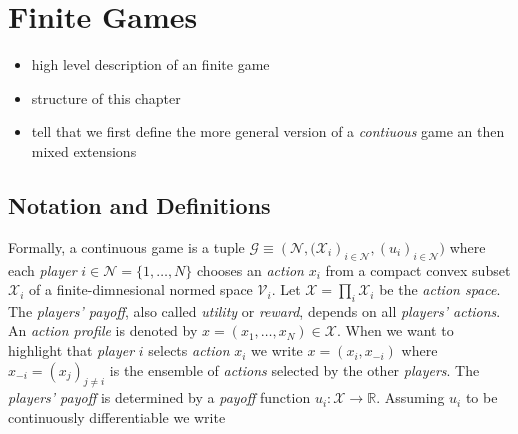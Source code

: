 
\chapter{Finite Games}\label{chapter:finiteGames}

\begin{itemize}
    \item high level description of an finite game
    \item structure of this chapter
    \item tell that we first define the more general version of a \textit{contiuous} game an then mixed extensions
    
\end{itemize}

\begin{comment}
    We are thus led to the following fundamental question: if all players of a repeated game employ a no-regret updating policy, do their actions converge to a Nash equilibrium of the underlying game? In general, the answer to this question is a resounding “no”. Even in simple, finite games, no-regret learning may cycle [27] and its limit set may contain highly non- rationalizable strategies that assign positive weight only to strictly dominated strategies [48]. As such, our aim in this paper is twofold \cite{mertikopoulos} p.466
\end{comment}

\section{Notation and Definitions}\label{section:notationAndDefinitionsGames}

Formally, a continuous game is a tuple $\mathcal{G} \equiv (\mathcal{N}, {(\mathcal{X}_i})_{i\in\mathcal{N}},{(u_i)}_{i\in\mathcal{N}})$ where each \textit{player} $i \in \mathcal{N} = \{1,\dots,N\}$ chooses an \textit{action} $x_i$ from a compact convex subset $\mathcal{X}_i$ of a finite-dimnesional normed space $\mathcal{V}_i$. Let $\mathcal{X} = \prod_{i}\mathcal{X}_i$ be the \textit{action space}. The \textit{players' payoff}, also called \textit{utility} or \textit{reward}, depends on all \textit{players' actions}. An \textit{action profile} is denoted by $x = (x_1,\dots,x_N) \in \mathcal{X}$. When we want to highlight that \textit{player} $i$ selects \textit{action} $x_i$ we write $x = (x_i,x_{-i})$ where $x_{-i} = {(x_j)}_{j\neq i}$ is the ensemble of \textit{actions} selected by the other \textit{players}. The \textit{players' payoff} is determined by a \textit{payoff }function $u_i : \mathcal{X} \to \mathbb{R} $. Assuming $u_i$ to be continuously differentiable we write 

